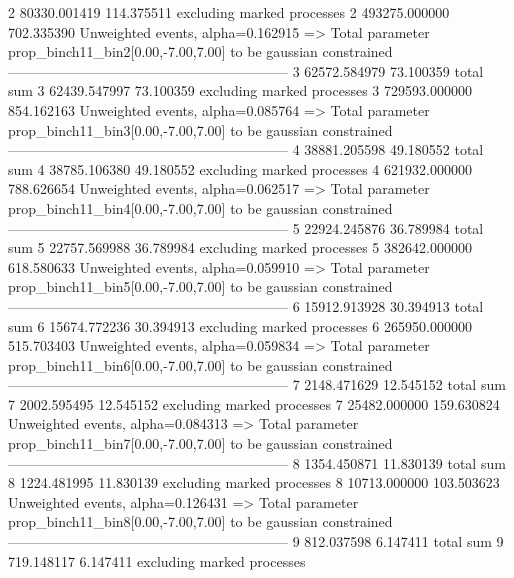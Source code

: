 2          80330.001419    114.375511      excluding marked processes    
2          493275.000000   702.335390      Unweighted events, alpha=0.162915
  => Total parameter prop_binch11_bin2[0.00,-7.00,7.00] to be gaussian constrained
------------------------------------------------------------
3          62572.584979    73.100359       total sum                     
3          62439.547997    73.100359       excluding marked processes    
3          729593.000000   854.162163      Unweighted events, alpha=0.085764
  => Total parameter prop_binch11_bin3[0.00,-7.00,7.00] to be gaussian constrained
------------------------------------------------------------
4          38881.205598    49.180552       total sum                     
4          38785.106380    49.180552       excluding marked processes    
4          621932.000000   788.626654      Unweighted events, alpha=0.062517
  => Total parameter prop_binch11_bin4[0.00,-7.00,7.00] to be gaussian constrained
------------------------------------------------------------
5          22924.245876    36.789984       total sum                     
5          22757.569988    36.789984       excluding marked processes    
5          382642.000000   618.580633      Unweighted events, alpha=0.059910
  => Total parameter prop_binch11_bin5[0.00,-7.00,7.00] to be gaussian constrained
------------------------------------------------------------
6          15912.913928    30.394913       total sum                     
6          15674.772236    30.394913       excluding marked processes    
6          265950.000000   515.703403      Unweighted events, alpha=0.059834
  => Total parameter prop_binch11_bin6[0.00,-7.00,7.00] to be gaussian constrained
------------------------------------------------------------
7          2148.471629     12.545152       total sum                     
7          2002.595495     12.545152       excluding marked processes    
7          25482.000000    159.630824      Unweighted events, alpha=0.084313
  => Total parameter prop_binch11_bin7[0.00,-7.00,7.00] to be gaussian constrained
------------------------------------------------------------
8          1354.450871     11.830139       total sum                     
8          1224.481995     11.830139       excluding marked processes    
8          10713.000000    103.503623      Unweighted events, alpha=0.126431
  => Total parameter prop_binch11_bin8[0.00,-7.00,7.00] to be gaussian constrained
------------------------------------------------------------
9          812.037598      6.147411        total sum                     
9          719.148117      6.147411        excluding marked processes    
